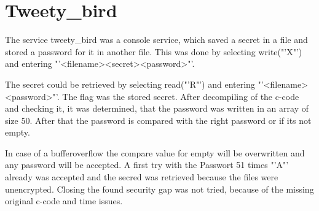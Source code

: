 \chapter{Tweety\_bird}

The service tweety\_bird was a console service, which saved a secret in a file and stored a password for it in another file. This was done by selecting write("'X"') and entering "'\textless filename\textgreater \textless secret\textgreater \textless password\textgreater"'. 

The secret could be retrieved by selecting read("'R"') and entering "'\textless filename\textgreater \textless password\textgreater"'. The flag was the stored secret. After decompiling of the c-code and checking it, it was determined, that the password was written in an array of size 50. After that the password is compared with the right password or if its not empty. 

In case of a bufferoverflow the compare value for empty will be overwritten and any password will be accepted. A first try with the Passwort 51 times "'A"' already was accepted and the secred was retrieved because the files were unencrypted. Closing the found security gap was not tried, because of the missing original c-code and time issues.